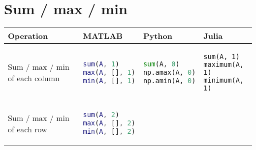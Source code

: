 \documentclass[]{article}
\begin{document}
\section{Sum / max / min}\label{sum-max-min}

\begin{longtable}[]{@{}llll@{}}
\toprule
\begin{minipage}[b]{0.23\columnwidth}\raggedright\strut
Operation\strut
\end{minipage} & \begin{minipage}[b]{0.22\columnwidth}\raggedright\strut
MATLAB\strut
\end{minipage} & \begin{minipage}[b]{0.24\columnwidth}\raggedright\strut
Python\strut
\end{minipage} & \begin{minipage}[b]{0.20\columnwidth}\raggedright\strut
Julia\strut
\end{minipage}\tabularnewline
\midrule
\endhead
\begin{minipage}[t]{0.23\columnwidth}\raggedright\strut
Sum / max / min of each column\strut
\end{minipage} & \begin{minipage}[t]{0.22\columnwidth}\raggedright\strut
\begin{lstlisting}[language=Matlab]
sum(A, 1)
max(A, [], 1)
min(A, [], 1)
\end{lstlisting}
\strut
\end{minipage} & \begin{minipage}[t]{0.24\columnwidth}\raggedright\strut
\begin{lstlisting}[language=Python]
sum(A, 0)
np.amax(A, 0)
np.amin(A, 0)
\end{lstlisting}
\strut
\end{minipage} & \begin{minipage}[t]{0.20\columnwidth}\raggedright\strut
\begin{lstlisting}
sum(A, 1)
maximum(A, 1)
minimum(A, 1)
\end{lstlisting}
\strut
\end{minipage}\tabularnewline
\begin{minipage}[t]{0.23\columnwidth}\raggedright\strut
Sum / max / min of each row\strut
\end{minipage} & \begin{minipage}[t]{0.22\columnwidth}\raggedright\strut
\begin{lstlisting}[language=Matlab]
sum(A, 2)
max(A, [], 2)
min(A, [], 2)

\end{lstlisting}
\end{minipage}
\end{longtable}
\end{document}
